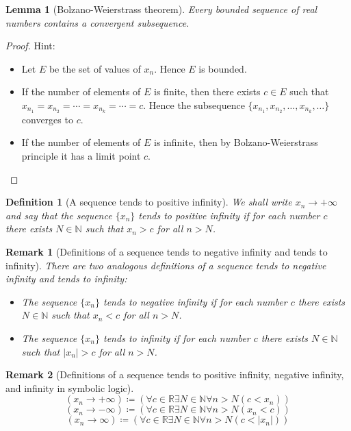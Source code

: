 \documentclass[onecolumn]{ctexart}
\newtheorem{definition}{Definition}
\newtheorem{lemma}{Lemma}
\newtheorem{remark}{Remark}
\begin{document}
\begin{lemma}[Bolzano-Weierstrass theorem]
  Every bounded sequence of real numbers contains a convergent subsequence.
\end{lemma}
\begin{proof}
  Hint:
  \begin{itemize}
    \item Let $E$ be the set of values of $x_n$. Hence $E$ is bounded.
    \item If the number of elements of $E$ is finite, then there exists $c \in E$ 
    such that $x_{n_1} = x_{n_2} = \cdots = x_{n_k} = \cdots = c$. Hence the 
    subsequence $\lbrace x_{n_1}, x_{n_2}, \ldots, x_{n_k}, \ldots \rbrace$ 
    converges to $c$.
    \item If the number of elements of $E$ is infinite, then by 
    Bolzano-Weierstrass principle it has a limit point $c$.
  \end{itemize}
\end{proof}

\begin{definition}[A sequence tends to positive infinity]
  We shall write $x_n \to +\infty$ and say that the sequence $\lbrace x_n 
  \rbrace$ tends to positive infinity if for each number $c$ there exists $N \in 
  \mathbb{N}$ such that $x_n > c$ for all $n > N$.
\end{definition}
\begin{remark}[Definitions of a sequence tends to negative infinity and tends to infinity]
  There are two analogous definitions of a sequence tends to negative infinity 
  and tends to infinity:
  \begin{itemize}
    \item The sequence $\lbrace x_n \rbrace$ tends to negative infinity if for 
    each number $c$ there exists $N \in \mathbb{N}$ such that $x_n < c$ for all 
    $n > N$.
    \item The sequence $\lbrace x_n \rbrace$ tends to infinity if for each number 
    $c$ there exists $N \in \mathbb{N}$ such that $|x_n| > c$ for all $n > N$.
  \end{itemize}
\end{remark}
\begin{remark}[Definitions of a sequence tends to positive infinity, negative infinity, and infinity in symbolic logic]
  \[
    (x_n \to +\infty) \coloneqq (\forall c \in \mathbb{R} \exists N \in \mathbb{N} \forall n > N (c < x_n))
  \]
  \[
    (x_n \to -\infty) \coloneqq (\forall c \in \mathbb{R} \exists N \in \mathbb{N} \forall n > N (x_n < c))
  \]
  \[
    (x_n \to \infty) \coloneqq (\forall c \in \mathbb{R} \exists N \in \mathbb{N} \forall n > N (c < |x_n|))
  \]
\end{remark}
\end{document}
